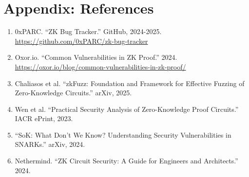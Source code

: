 \documentclass[11pt,a4paper]{article}
\begin{document}
\section{Appendix: References}

\begin{enumerate}
    \item 0xPARC. ``ZK Bug Tracker.'' GitHub, 2024-2025. \\
    \url{https://github.com/0xPARC/zk-bug-tracker}

    \item Oxor.io. ``Common Vulnerabilities in ZK Proof.'' 2024. \\
    \url{https://oxor.io/blog/common-vulnerabilities-in-zk-proof/}

    \item Chaliasos et al. ``zkFuzz: Foundation and Framework for Effective Fuzzing of Zero-Knowledge Circuits.'' arXiv, 2025.

    \item Wen et al. ``Practical Security Analysis of Zero-Knowledge Proof Circuits.'' IACR ePrint, 2023.

    \item ``SoK: What Don't We Know? Understanding Security Vulnerabilities in SNARKs.'' arXiv, 2024.

    \item Nethermind. ``ZK Circuit Security: A Guide for Engineers and Architects.'' 2024.
\end{enumerate}
\end{document}
